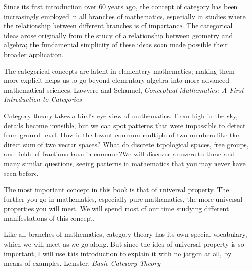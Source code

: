 \documentclass[11pt,openany]{book}
\begin{document}
\begin{boxquote}
Since its first introduction over $60$ years ago, the concept of category has been
increasingly employed in all branches of mathematics, especially in studies where the
relationship between different branches is of importance. The categorical ideas arose
originally from the study of a relationship between geometry and algebra; the
fundamental simplicity of these ideas soon made possible their broader application.
\par
The categorical concepts are latent in elementary mathematics; making them more
explicit helps us to go beyond elementary algebra into more advanced mathematical
sciences.
\tcblower
{Lawvere and Schanuel, 
\emph{Conceptual Mathematics: 
A First Introduction to Categories}~\cite{LawvereSchanuel:2009:ConceptualMath}}
\end{boxquote}

\begin{boxquote}
Category theory takes a bird’s eye view of mathematics. From high in the sky,
details become invisible, but we can spot patterns that were impossible to detect
from ground level. How is the lowest common multiple of two numbers
like the direct sum of two vector spaces? What do discrete topological spaces,
free groups, and fields of fractions have in common?We will discover answers
to these and many similar questions, seeing patterns in mathematics that you
may never have seen before.
\par
The most important concept in this book is that of universal property. The
further you go in mathematics, especially pure mathematics, the more universal
properties you will meet. We will spend most of our time studying different
manifestations of this concept.
\par
Like all branches of mathematics, category theory has its own special vocabulary,
which we will meet as we go along. But since the idea of universal
property is so important, I will use this introduction to explain it with no jargon
at all, by means of examples.
\tcblower
{Leinster, \emph{Basic Category Theory}~\cite{Leinster:2016:BasicCategoryTheory}}
\end{boxquote}
\end{document}
